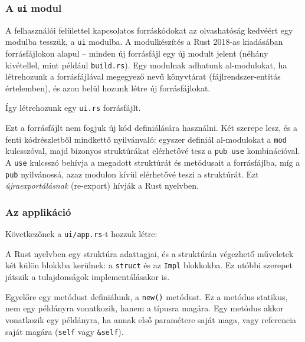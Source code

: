 
\subsubsection{A \texttt{ui} modul}

A felhasználói felülettel kapcsolatos forráskódokat az olvashatóság kedvéért egy modulba tesszük,
a \texttt{ui} modulba.
A modulkészítés a Rust 2018-as kiadásában forrásfájlokon alapul -- 
minden új forrásfájl egy új modult jelent (néhány kivétellel, mint például \texttt{build.rs}).
Egy modulnak adhatunk al-modulokat, ha létrehozunk a forrásfájlával megegyező nevű könyvtárat (fájlrendszer-entitás értelemben),
és azon belül hozunk létre új forrásfájlokat.

Így létrehozunk egy \texttt{ui.rs} forrásfájlt.



Ezt a forrásfájlt nem fogjuk új kód definiálására használni.
Két szerepe lesz, és a fenti kódrészletből mindkettő nyilvánvaló: 
egyszer definiál al-modulokat a \texttt{mod} kulcsszóval,
majd bizonyos struktúrákat elérhetővé tesz a \texttt{pub use} kombinációval.
A \texttt{use} kulcsszó behívja a megadott struktúrát és metódusait a forrásfájlba,
míg a \texttt{pub} nyilvánossá, azaz modulon kívül elérhetővé teszi a struktúrát.
Ezt \textit{újraexportálásnak} (re-export) hívják a Rust nyelvben.

\subsubsection{Az applikáció}

Következőnek a \texttt{ui/app.rs}-t hozzuk létre:



A Rust nyelvben egy struktúra adattagjai, és a struktúrán végezhető műveletek két külön blokkba
kerülnek: a \texttt{struct} és az \texttt{Impl} blokkokba.
Ez utóbbi szerepet játszik a tulajdonságok implementálásakor is.

Egyelőre egy metódust definiálunk, a \texttt{new()} metódust.
Ez a metódus statikus, nem egy példányra vonatkozik, hanem a típusra magára.
Egy metódus akkor vonatkozik egy példányra, ha annak első paramétere saját maga, vagy referencia saját magára
(\texttt{self} vagy \verb+&self+).

